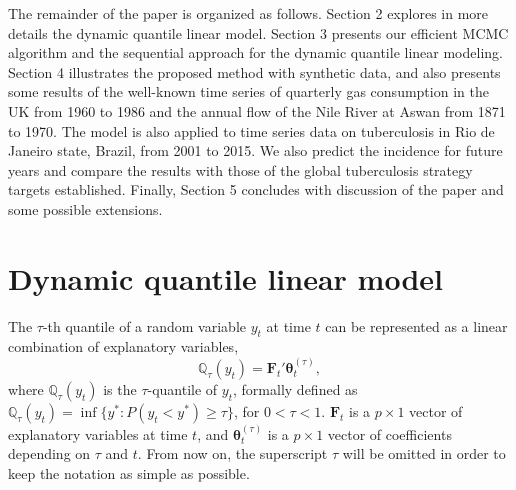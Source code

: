 \documentclass[12pt,a4paper]{article}\usepackage[]{graphicx}\usepackage[]{color}\usepackage{subfigure}
\newcommand{\bfFt}{\mathbf{F}_t}
\newcommand{\bftheta}{\boldsymbol{\theta}}
\begin{document}
The remainder of the paper is organized as follows. 
Section 2 explores in more details the dynamic quantile linear model.
Section 3 presents our efficient MCMC algorithm and the sequential approach for the dynamic quantile linear modeling. 
Section 4 illustrates the proposed method with synthetic data, and also presents some results of the well-known time series of quarterly gas consumption in the UK from 1960 to 1986 and the annual flow of the Nile River at Aswan from 1871 to 1970. 
The model is also applied to time series data on tuberculosis in Rio de Janeiro state, Brazil, from 2001 to 2015. We also predict the incidence for future years and compare the results with those of the global tuberculosis strategy targets established. 
Finally, Section 5 concludes with discussion of the paper and some possible extensions.


 

\section{Dynamic quantile linear model}

The $\tau$-th quantile of a random variable $y_t$ at time $t$ can be represented as a linear combination of explanatory variables, 
$$\mathbb{Q}_\tau(y_t) = \bfFt' \bftheta_t^{(\tau)},$$
where $\mathbb{Q}_\tau(y_t)$ is the $\tau$-quantile of $y_t$, formally defined as $\mathbb{Q}_\tau(y_t) = \inf \{y^* : P(y_t < y^* ) \geq \tau\}$, for $0<\tau<1$. 
$\bfFt$ is a $p \times 1$ vector of explanatory variables at time $t$, and $\bftheta_t^{(\tau)}$ is a $p \times 1$ vector of coefficients depending on $\tau$ and $t$. 
From now on, the superscript $\tau$ will be omitted in order to keep the notation as simple as possible.
\end{document}
